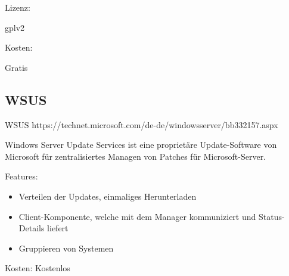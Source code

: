Lizenz:

\gls{gplv2}

Kosten:

Gratis



\subsection{WSUS}

\gls{WSUS}
https://technet.microsoft.com/de-de/windowsserver/bb332157.aspx

Windows Server Update Services ist eine proprietäre Update-Software von Microsoft für zentralisiertes Managen von Patches für Microsoft-Server.

Features:

\begin{itemize}
\item Verteilen der Updates, einmaliges Herunterladen
\item Client-Komponente, welche mit dem Manager kommuniziert und Status-Details liefert
\item Gruppieren von Systemen
\end{itemize}

Kosten:
Kostenlos
